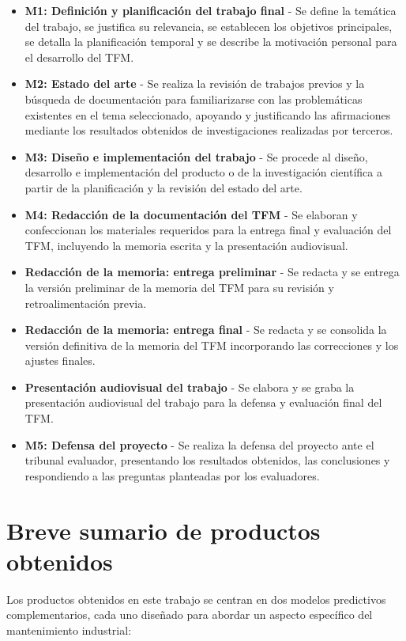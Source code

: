 \documentclass[IB]{TFUOC}
\begin{document}
\begin{itemize}
  \item \textbf{M1: Definición y planificación del trabajo final} - Se define la temática del trabajo, se justifica su
        relevancia, se establecen los objetivos principales, se detalla la planificación temporal y se describe la
        motivación personal para el desarrollo del TFM.
  \item \textbf{M2: Estado del arte} - Se realiza la revisión de trabajos previos y la búsqueda de documentación para
        familiarizarse con las problemáticas existentes en el tema seleccionado, apoyando y justificando las
        afirmaciones mediante los resultados obtenidos de investigaciones realizadas por terceros.
  \item \textbf{M3: Diseño e implementación del trabajo} - Se procede al diseño, desarrollo e implementación del
        producto o de la investigación científica a partir de la planificación y la revisión del estado del arte.
  \item \textbf{M4: Redacción de la documentación del TFM} - Se elaboran y confeccionan los materiales requeridos para
        la entrega final y evaluación del TFM, incluyendo la memoria escrita y la presentación audiovisual.
  \item \textbf{Redacción de la memoria: entrega preliminar} - Se redacta y se entrega la versión preliminar de la
        memoria del TFM para su revisión y retroalimentación previa.
  \item \textbf{Redacción de la memoria: entrega final} - Se redacta y se consolida la versión definitiva de la memoria
        del TFM incorporando las correcciones y los ajustes finales.
  \item \textbf{Presentación audiovisual del trabajo} - Se elabora y se graba la presentación audiovisual del trabajo
        para la defensa y evaluación final del TFM.
  \item \textbf{M5: Defensa del proyecto} - Se realiza la defensa del proyecto ante el tribunal evaluador, presentando
        los resultados obtenidos, las conclusiones y respondiendo a las preguntas planteadas por los evaluadores.
\end{itemize}

\section{Breve sumario de productos obtenidos}

Los productos obtenidos en este trabajo se centran en dos modelos predictivos complementarios, cada uno diseñado para
abordar un aspecto específico del mantenimiento industrial:
\end{document}
